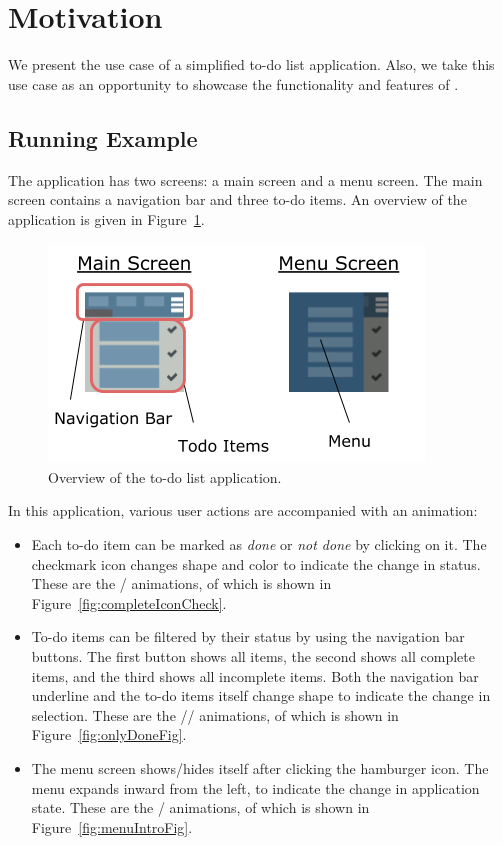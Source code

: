 \section{Motivation}
\label{sec:motivation}

We present the use case of a simplified to-do list application. Also, we take this use case as an opportunity to showcase the functionality and features of \dsl{}.

\subsection{Running Example}

The application has two screens: a main screen and a menu screen. The main screen contains a navigation bar and three to-do items. An overview of the application is given in Figure~\ref{fig:appOverview}.

\begin{figure}[!htbp]
\centering
\includegraphics[width=\figscale\textwidth]{pictures/app_overview}
\caption{Overview of the to-do list application.}
\label{fig:appOverview}
\end{figure}

In this application, various user actions are accompanied with an animation:
\begin{itemize}
\item Each to-do item can be marked as \emph{done} or \emph{not done} by clicking on it. The checkmark icon changes shape and color to indicate the change in status. These are the / animations, of which  is shown in Figure~\ref{fig:completeIconCheck}.
\item To-do items can be filtered by their status by using the navigation bar buttons. The first button shows all items, the second shows all complete items, and the third shows all incomplete items. Both the navigation bar underline and the to-do items itself change shape to indicate the change in selection. These are the // animations, of which  is shown in Figure~\ref{fig:onlyDoneFig}.
\item The menu screen shows/hides itself after clicking the hamburger icon. The menu expands inward from the left, to indicate the change in application state. These are the / animations, of which  is shown in Figure~\ref{fig:menuIntroFig}.
\end{itemize}

